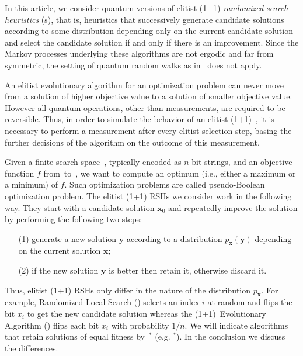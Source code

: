 In this article, we consider quantum versions of elitist (1+1) \emph{randomized search heuristics} (\rsh{}s), that is, heuristics that successively generate candidate solutions according to some distribution depending only on the current candidate solution and select the candidate solution if and only if there is an improvement. Since the Markov processes underlying these algorithms are not ergodic and far from symmetric, the setting of quantum random walks as in~\cite{Szegedy04,MagniezNRS07,MagniezNRS09} does not apply.

An elitist evolutionary algorithm for an optimization problem can never move from a solution of higher objective value to a solution of smaller objective value. However all quantum operations, other than measurements, are required to be reversible. Thus, in order to simulate the behavior of an elitist (1+1)~\rsh{}, it is necessary to perform a measurement after every elitist selection step, basing the further decisions of the algorithm on the outcome of this measurement.

Given a finite search space~\SCal, typically encoded as $n$-bit strings, and an objective function $f$ from~\SCal to~\RSet, we want to compute an optimum (i.e., either a maximum or a minimum) of $f$. Such optimization problems are called pseudo-Boolean optimization problem. The elitist (1+1) RSHs we consider work in the following way. They start with a candidate solution $\mathbf{x}_0$ and repeatedly improve the solution by performing the following two steps:
\begin{itemize}
\item[(1)] generate a new solution $\mathbf{y}$ according to a   distribution $p_\mathbf{x}(\mathbf{y})$ depending on the current   solution $\mathbf{x}$;
\item[(2)] if the new solution $\mathbf{y}$ is better then retain it,   otherwise discard it.
\end{itemize}

Thus, elitist (1+1) RSHs only differ in the nature of the distribution $p_\mathbf{x}$. For example, Randomized Local Search (\rls) selects an index $i$ at random and flips the bit $x_i$ to get the new candidate solution whereas the (1+1)~Evolutionary Algorithm (\ea) flips each bit $x_i$ with probability $1/n$. We will indicate algorithms that retain solutions of equal fitness by~$^*$ (e.g. \rls{}$^*$). In the conclusion we discuss the differences. 

